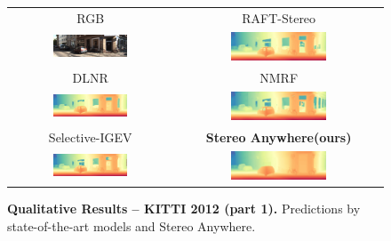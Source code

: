 \documentclass[10pt,twocolumn,letterpaper]{article}
\newcommand{\method}[0]{Stereo Anywhere\xspace}
\begin{document}
\begin{figure}[h]
\begin{tabular}{cc}
        \small RGB &
        \small RAFT-Stereo \cite{lipson2021raft} \\
        \includegraphics[width=0.48\textwidth]{imgs/KITTI12/rgb/68.jpg} &
        \includegraphics[width=0.48\textwidth]{imgs/KITTI12/stereo/RAFT-Stereo/68.jpg} \\
        \small DLNR \cite{zhao2023high} &
        \small NMRF \cite{guan2024neural} \\
        \includegraphics[width=0.48\textwidth]{imgs/KITTI12/stereo/DLNR/68.jpg} &
        \includegraphics[width=0.48\textwidth]{imgs/KITTI12/stereo/NMRF/68.jpg} \\
        \small Selective-IGEV \cite{wang2024selective} &
        \textbf{\method (ours)} \\
        \includegraphics[width=0.48\textwidth]{imgs/KITTI12/stereo/Selective/68.jpg} &
        \includegraphics[width=0.48\textwidth]{imgs/KITTI12/stereo/Ours/68.jpg} \\
    \end{tabular}\vspace{-0.3cm}
    \caption{\textbf{Qualitative Results -- KITTI 2012 (part 1).} Predictions by state-of-the-art models and \method.}
    \label{fig:qual_kitti12_1}\vspace{-0.3cm}
\end{figure}
\end{document}

